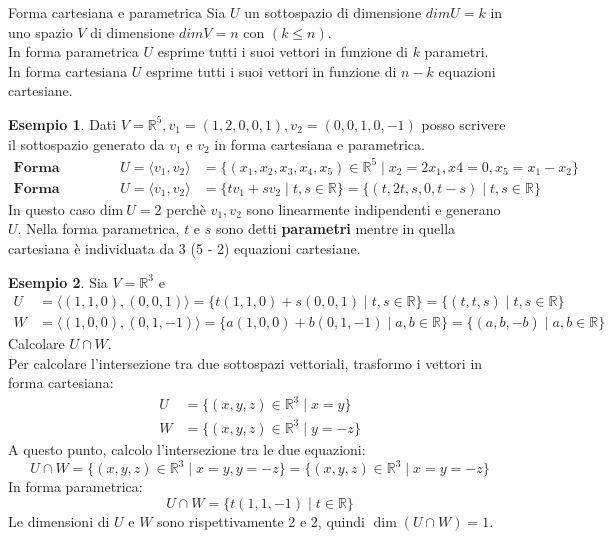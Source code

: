 \documentclass[a4paper]{article}
\theoremstyle{definition}
\newtheorem*{es}{Esempio}
\begin{document}
\begin{deff}{Forma cartesiana e parametrica}{}
	Sia $U$ un sottospazio di dimensione $dim U = k$ in uno spazio $V$ di dimensione $dim V = n$ con $(k \leq n)$. \\
	In forma parametrica $U$ esprime tutti i suoi vettori in funzione di $k$ parametri. \\
	In forma cartesiana $U$ esprime tutti i suoi vettori in funzione di $n - k$ equazioni cartesiane.
\end{deff}
\begin{es}
	Dati $V = \mathbb{R}^5, v_1 = (1, 2, 0, 0, 1), v_2 = (0, 0, 1, 0, -1)$ posso scrivere il sottospazio generato da $v_1$ e $v_2$ in forma cartesiana e parametrica.
	\begin{align*}
		\textbf{Forma cartesiana}  &  & U = \langle v_1, v_2 \rangle & = \{(x_1, x_2, x_3, x_4, x_5) \in \mathbb{R}^5 \mid x_2 = 2x_1, x4 = 0, x_5 = x_1 - x_2\}      \\
		\textbf{Forma parametrica} &  & U = \langle v_1, v_2 \rangle & = \{tv_1 + sv_2 \mid t, s \in \mathbb{R}\} = \{(t, 2t, s, 0, t - s) \mid t, s \in \mathbb{R}\}
	\end{align*}
	In questo caso $\text{dim} \ U = 2$ perchè $v_1, v_2$ sono linearmente indipendenti e generano $U$.
	Nella forma parametrica, $t$ e $s$ sono detti \textbf{parametri} mentre in quella cartesiana è individuata da 3 (5 - 2) equazioni cartesiane.
\end{es}
\begin{es}
	Sia $V = \mathbb{R}^3$ e
	\begin{align*}
		U & = \langle (1, 1, 0), (0, 0, 1) \rangle = \{t(1, 1, 0) + s(0, 0, 1) \mid t, s \in \mathbb{R}\} = \{(t, t, s) \mid t, s \in \mathbb{R}\}    \\
		W & = \langle (1, 0, 0), (0, 1, -1) \rangle = \{a(1, 0, 0) + b(0, 1, -1) \mid a, b \in \mathbb{R}\} = \{(a, b, -b) \mid a, b \in \mathbb{R}\}
	\end{align*}
	Calcolare $U \cap W$.
	\\
	Per calcolare l'intersezione tra due sottospazi vettoriali, trasformo i vettori in forma cartesiana:
	\begin{align*}
		U & = \{(x, y, z) \in \mathbb{R}^3 \mid x = y\}  \\
		W & = \{(x, y, z) \in \mathbb{R}^3 \mid y = -z\}
	\end{align*}
	A questo punto, calcolo l'intersezione tra le due equazioni:
	\begin{equation*}
		U \cap W = \{(x, y, z) \in \mathbb{R}^3 \mid x = y, y = -z\} = \{(x, y, z) \in \mathbb{R}^3 \mid x = y = -z\}
	\end{equation*}
	In forma parametrica:
	\begin{equation*}
		U \cap W = \{t(1, 1, -1) \mid t \in \mathbb{R}\}
	\end{equation*}
	Le dimensioni di $U$ e $W$ sono rispettivamente 2 e 2, quindi $\dim(U \cap W) = 1$.
\end{es}
\end{document}
